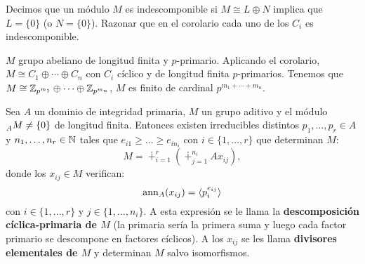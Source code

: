 \begin{ejercicio}
  Decimos que un módulo \(M\) es indescomponible si \(M\cong
  L\oplus N\) implica que \(L=\{0\}\) (o \(N=\{0\}\)).
  Razonar que en el corolario cada uno de los \(C_i\) es indescomponible.
\end{ejercicio}

\begin{ejemplo}
  \(M\) grupo abeliano de longitud finita y \(p\)-primario.
  Aplicando el corolario, \(M\cong C_1\oplus\cdots\oplus C_n\) con
  \(C_i\) cíclico y de longitud finita \(p\)-primarios.
  Tenemos que \(M\cong \mathbb{Z}_{p^{m_1}}\oplus\cdots\oplus\mathbb{Z}_{p^{m_n}}\),
  \(M\) es finito de cardinal \(p^{m_1+\cdots+m_n}\).
\end{ejemplo}

\begin{teo}
  Sea \(A\) un dominio de integridad primaria, \(M\) un grupo aditivo y el módulo
  \(\prescript{}{A}{M}\neq\{0\}\) de longitud finita. Entonces existen
  irreducibles distintos \(p_1,\ldots,p_r\in A\) y 
  \(n_1,\ldots, n_r \in \mathbb{N}\) tales que \(e_{i1}\ge\ldots\ge e_{in_i}\) con
  \(i\in\{1,\ldots,r\}\) que determinan \(M\):
  \[
    M=\dotplus_{i=1}^r\left(\dotplus_{j=1}^{n_i} Ax_{ij}\right),
  \]
  donde los \(x_{ij}\in M\) verifican:
  \[
    \operatorname{ann}_A(x_{ij})=\langle p_i^{e_{ij}}\rangle
  \]
  con \(i\in\{1,\ldots,r\}\) y \(j\in\{1,\ldots, n_i\}\).
  A esta expresión
  se le llama la \textbf{descomposición cíclica-primaria de \(M\)} (la
  primaria sería la primera suma y luego cada factor primario se
  descompone en factores cíclicos).
  A los \(x_{ij}\) se les llama
  \textbf{divisores elementales de \(M\)} y determinan \(M\) salvo isomorfismos.
\end{teo}

